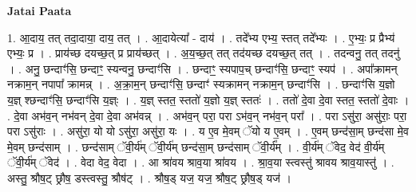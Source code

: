 \documentclass[17pt]{extarticle}
\begin{document}
\textbf{Jatai Paata} \newline

1. आ॒दाय॒ तत् तदा॒दाया॒ दाय॒ तत् । . आ॒दायेत्या᳚ - दाय॑ । . तदे᳚भ्य एभ्य॒ स्तत् तदे᳚भ्यः । . ए॒भ्यः॒ प्र प्रैभ्य॑ एभ्यः॒ प्र । . प्राय॑च्छ दयच्छ॒त् प्र प्राय॑च्छत् । . अ॒य॒च्छ॒त् तत् तद॑यच्छ दयच्छ॒त् तत् । . तदन्वनु॒ तत् तदनु॑ । . अनु॒ छन्दाꣳ॑सि॒ छन्दाꣳ॒॒ स्यन्वनु॒ छन्दाꣳ॑सि । . छन्दाꣳ॒॒ स्यपाप॒च् छन्दाꣳ॑सि॒ छन्दाꣳ॒॒ स्यप॑ । . अपा᳚क्रामन् नक्राम॒न् नपापा᳚ क्रामन्न् । . अ॒क्रा॒म॒न् छन्दाꣳ॑सि॒ छन्दाꣳ॑ स्यक्रामन् नक्राम॒न् छन्दाꣳ॑सि । . छन्दाꣳ॑सि य॒ज्ञो य॒ज्ञ् श्छन्दाꣳ॑सि॒ छन्दाꣳ॑सि य॒ज्ञ्ः । . य॒ज्ञ् स्तत॒ स्ततो॑ य॒ज्ञो य॒ज्ञ् स्ततः॑ । . ततो॑ दे॒वा दे॒वा स्तत॒ स्ततो॑ दे॒वाः । . दे॒वा अभ॑व॒न् नभ॑वन् दे॒वा दे॒वा अभ॑वन्न् । . अभ॑व॒न् परा॒ परा ऽभ॑व॒न् नभ॑व॒न् परा᳚ । . परा ऽसु॑रा॒ असु॑राः॒ परा॒ परा ऽसु॑राः । . असु॑रा॒ यो यो ऽसु॑रा॒ असु॑रा॒ यः । . य ए॒व मे॒वम् ॅयो य ए॒वम् । . ए॒वम् छन्द॑सा॒म् छन्द॑सा मे॒व मे॒वम् छन्द॑साम् । . छन्द॑साम् ॅवी॒र्य॑म् ॅवी॒र्य॑म् छन्द॑सा॒म् छन्द॑साम् ॅवी॒र्य᳚म् । . वी॒र्य॑म् ॅवेद॒ वेद॑ वी॒र्य॑म् ॅवी॒र्य॑म् ॅवेद॑ । . वेदा वेद॒ वेदा । . आ श्रा॑वय श्राव॒या श्रा॑वय । . श्रा॒व॒या स्त्वस्तु॑ श्रावय श्राव॒यास्तु॑ । . अस्तु॒ श्रौष॒ट् छ्रौष॒ डस्त्वस्तु॒ श्रौष॑ट् । . श्रौष॒ड् यज॒ यज॒ श्रौष॒ट् छ्रौष॒ड् यज॑ । \newline
\end{document}
